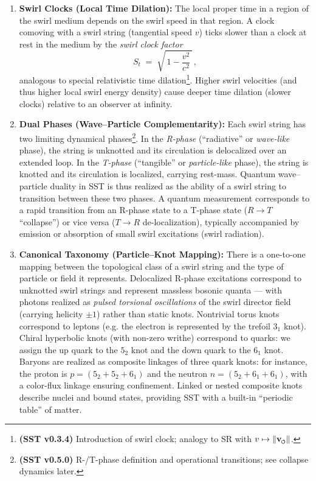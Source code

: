 \documentclass[reprint,aps,onecolumn,nofootinbib]{revtex4-2}
\newcommand{\swirlarrow}{%
    \mathchoice{\mkern-2mu\scriptstyle\boldsymbol{\circlearrowleft}}%
    {\mkern-2mu\scriptstyle\boldsymbol{\circlearrowleft}}%
    {\mkern-2mu\scriptscriptstyle\boldsymbol{\circlearrowleft}}%
    {\mkern-2mu\scriptscriptstyle\boldsymbol{\circlearrowleft}}%
}
\newcommand{\vswirl}{\mathbf{v}_{\swirlarrow}}
\begin{document}
\begin{enumerate}
    \item \textbf{Swirl Clocks (Local Time Dilation):} The local proper time in a region of the swirl medium depends on the swirl speed in that region. A clock comoving with a swirl string (tangential speed $v$) ticks slower than a clock at rest in the medium by the \emph{swirl clock factor}
    \[
        S_t \;=\; \sqrt{\,1 - \frac{v^2}{c^2}\,}\,,
    \]
    analogous to special relativistic time dilation\footnote{\textbf{(SST v0.3.4)} Introduction of swirl clock; analogy to SR with $v\mapsto \|\vswirl\|$.}. Higher swirl velocities (and thus higher local swirl energy density) cause deeper time dilation (slower clocks) relative to an observer at infinity.
    \item \textbf{Dual Phases (Wave–Particle Complementarity):} Each swirl string has two limiting dynamical phases\footnote{\textbf{(SST v0.5.0)} R-/T-phase definition and operational transitions; see collapse dynamics later.}. In the \emph{R-phase} (“radiative” or \emph{wave-like} phase), the string is unknotted and its circulation is delocalized over an extended loop. In the \emph{T-phase} (“tangible” or \emph{particle-like} phase), the string is knotted and its circulation is localized, carrying rest-mass. Quantum wave–particle duality in SST is thus realized as the ability of a swirl string to transition between these two phases. A quantum measurement corresponds to a rapid transition from an R-phase state to a T-phase state ($R\to T$ “collapse”) or vice versa ($T\to R$ de-localization), typically accompanied by emission or absorption of small swirl excitations (swirl radiation).
    \item \textbf{Canonical Taxonomy (Particle–Knot Mapping):}
    There is a one-to-one mapping between the topological class of a swirl string and the type of particle or field it represents.
    Delocalized R-phase excitations correspond to unknotted swirl strings and represent massless bosonic quanta — with photons realized as \emph{pulsed torsional oscillations} of the swirl director field (carrying helicity $\pm 1$) rather than static knots.
    Nontrivial torus knots correspond to leptons (e.g. the electron is represented by the trefoil $3_1$ knot).
    Chiral hyperbolic knots (with non-zero writhe) correspond to quarks: we assign the up quark to the $5_2$ knot and the down quark to the $6_1$ knot.
    Baryons are realized as composite linkages of three quark knots: for instance, the proton is $p = (5_2 + 5_2 + 6_1)$ and the neutron $n = (5_2 + 6_1 + 6_1)$, with a color-flux linkage ensuring confinement.
    Linked or nested composite knots describe nuclei and bound states, providing SST with a built-in “periodic table” of matter.



    \end{enumerate}
\end{document}
